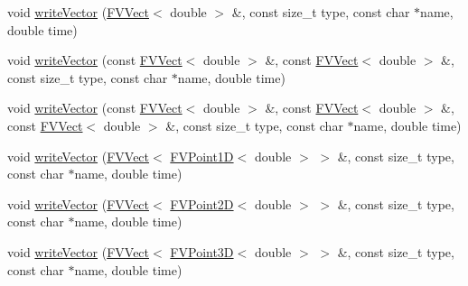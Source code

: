 \begin{DoxyCompactItemize}
\item 
void \hyperlink{classGmsh_a08dad2ee34abbc61f49d177b127dd66c}{writeVector} (\hyperlink{classFVVect}{FVVect}$<$ double $>$ \&, const size\_\-t type, const char $\ast$name, double time)
\item 
void \hyperlink{classGmsh_ab5a9ab67d5c0defc304b912832916f98}{writeVector} (const \hyperlink{classFVVect}{FVVect}$<$ double $>$ \&, const \hyperlink{classFVVect}{FVVect}$<$ double $>$ \&, const size\_\-t type, const char $\ast$name, double time)
\item 
void \hyperlink{classGmsh_a70c1eb0ea4541a96417c7be9ef1326a2}{writeVector} (const \hyperlink{classFVVect}{FVVect}$<$ double $>$ \&, const \hyperlink{classFVVect}{FVVect}$<$ double $>$ \&, const \hyperlink{classFVVect}{FVVect}$<$ double $>$ \&, const size\_\-t type, const char $\ast$name, double time)
\item 
void \hyperlink{classGmsh_a1e980b0bcfcdf66da0dd091765102477}{writeVector} (\hyperlink{classFVVect}{FVVect}$<$ \hyperlink{classFVPoint1D}{FVPoint1D}$<$ double $>$ $>$ \&, const size\_\-t type, const char $\ast$name, double time)
\item 
void \hyperlink{classGmsh_a14e065398cfc6b8225c5aff82678b542}{writeVector} (\hyperlink{classFVVect}{FVVect}$<$ \hyperlink{classFVPoint2D}{FVPoint2D}$<$ double $>$ $>$ \&, const size\_\-t type, const char $\ast$name, double time)
\item 
void \hyperlink{classGmsh_acd9861f26525833b58ea5ac69001516e}{writeVector} (\hyperlink{classFVVect}{FVVect}$<$ \hyperlink{classFVPoint3D}{FVPoint3D}$<$ double $>$ $>$ \&, const size\_\-t type, const char $\ast$name, double time)
\end{DoxyCompactItemize}



